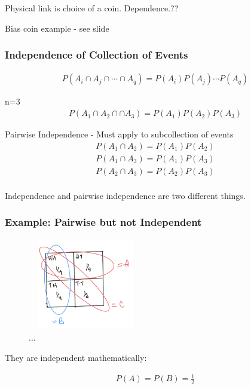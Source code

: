 \documentclass{article}
\begin{document}
Physical link is choice of a coin.  Dependence.??

Bias coin example - see slide

\subsubsection{Independence of Collection of Events}


\begin{align*}
P(A_i \cap A_j \cap \cdots \cap A_q) = P(A_i)P(A_j)\cdots P(A_q)
\end{align*}

n=3
\begin{align*}
P(A_1 \cap A_2 \cap \cap A_3) = P(A_1)P(A_2)P(A_3)
\end{align*}

Pairwise Independence - Must apply to subcollection of events
\begin{align*}
P(A_1 \cap A_2 ) = P(A_1)P(A_2)\\
P(A_1 \cap A_3 ) = P(A_1)P(A_3)\\
P(A_2 \cap A_3 ) = P(A_2)P(A_3)\\
\end{align*}

 Independence and pairwise independence are two different things.

\subsubsection{Example: Pairwise but not Independent}

\begin{figure}[ht]
\centering
\includegraphics[width=5cm, height=4cm]{images/L03/collection_indep.jpeg}
\caption{...}
\end{figure}

They are independent mathematically:

\begin{align*}
P(A)=P(B)=\frac{1}{2}\\
\end{align*}
\end{document}
